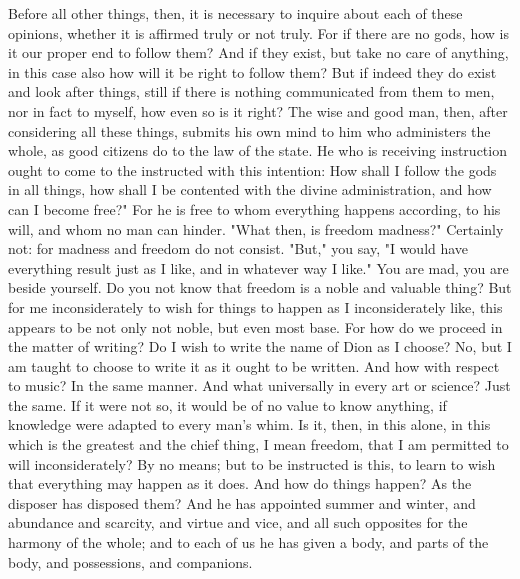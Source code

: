 \documentclass[a4paper]{article}
\begin{document}
Before all other things, then, it is necessary to inquire about each
of these opinions, whether it is affirmed truly or not truly. For
if there are no gods, how is it our proper end to follow them? And
if they exist, but take no care of anything, in this case also how
will it be right to follow them? But if indeed they do exist and look
after things, still if there is nothing communicated from them to
men, nor in fact to myself, how even so is it right? The wise and
good man, then, after considering all these things, submits his own
mind to him who administers the whole, as good citizens do to the
law of the state. He who is receiving instruction ought to come to
the instructed with this intention: How shall I follow the gods in
all things, how shall I be contented with the divine administration,
and how can I become free?" For he is free to whom everything happens
according, to his will, and whom no man can hinder. "What then, is
freedom madness?" Certainly not: for madness and freedom do not consist.
"But," you say, "I would have everything result just as I like, and
in whatever way I like." You are mad, you are beside yourself. Do
you not know that freedom is a noble and valuable thing? But for me
inconsiderately to wish for things to happen as I inconsiderately
like, this appears to be not only not noble, but even most base. For
how do we proceed in the matter of writing? Do I wish to write the
name of Dion as I choose? No, but I am taught to choose to write it
as it ought to be written. And how with respect to music? In the same
manner. And what universally in every art or science? Just the same.
If it were not so, it would be of no value to know anything, if knowledge
were adapted to every man's whim. Is it, then, in this alone, in this
which is the greatest and the chief thing, I mean freedom, that I
am permitted to will inconsiderately? By no means; but to be instructed
is this, to learn to wish that everything may happen as it does. And
how do things happen? As the disposer has disposed them? And he has
appointed summer and winter, and abundance and scarcity, and virtue
and vice, and all such opposites for the harmony of the whole; and
to each of us he has given a body, and parts of the body, and possessions,
and companions. 
\end{document}
